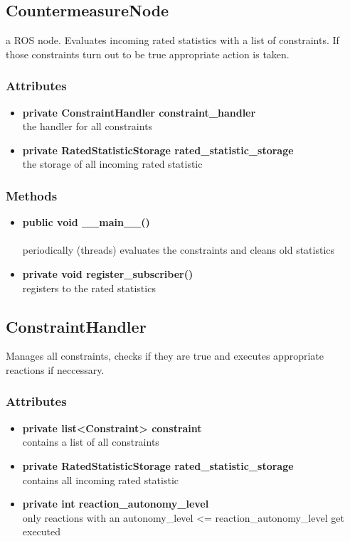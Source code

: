 \subsection{CountermeasureNode}
a ROS node. Evaluates incoming rated statistics with a list of constraints. If those constraints turn out to be true appropriate action is taken.
\subsubsection{Attributes}
\begin{itemize}
	\item \textbf{ private ConstraintHandler constraint\_handler}\\
		the handler for all constraints
	\item \textbf{ private RatedStatisticStorage rated\_statistic\_storage}\\
		the storage of all incoming rated statistic
\end{itemize}
\subsubsection{Methods}
\begin{itemize}
	\item \textbf{ public void \_\_main\_\_() }\\\\
		periodically (threads) evaluates the constraints and cleans old statistics
	\item \textbf{ private void register\_subscriber() }\\
		registers to the rated statistics
\end{itemize}



\subsection{ConstraintHandler}
Manages all constraints, checks if they are true and executes appropriate reactions if neccessary.

\subsubsection{Attributes}
\begin{itemize}
	\item \textbf{ private list<Constraint> constraint }\\
		contains a list of all constraints
	\item \textbf{ private  RatedStatisticStorage rated\_statistic\_storage }\\
		contains all incoming rated statistic
	\item \textbf{ private  int reaction\_autonomy\_level }\\
		only reactions with an autonomy\_level <= reaction\_autonomy\_level get executed
\end{itemize}
